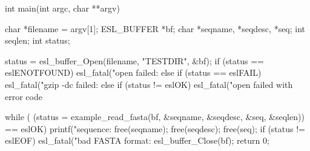 \begin{cchunk}
int
main(int argc, char **argv)
{
  char       *filename = argv[1];
  ESL_BUFFER *bf;
  char       *seqname, *seqdesc, *seq;
  int         seqlen;
  int         status;

  status = esl_buffer_Open(filename, "TESTDIR", &bf);
  if      (status == eslENOTFOUND) esl_fatal("open failed: %
  else if (status == eslFAIL)      esl_fatal("gzip -dc failed: %
  else if (status != eslOK)        esl_fatal("open failed with error code %

  while ( (status = example_read_fasta(bf, &seqname, &seqdesc, &seq, &seqlen)) == eslOK)
    {
      printf("sequence: %
      free(seqname);
      free(seqdesc);
      free(seq);
    }
  if (status != eslEOF) esl_fatal("bad FASTA format: %
  esl_buffer_Close(bf);
  return 0;
}
\end{cchunk}
